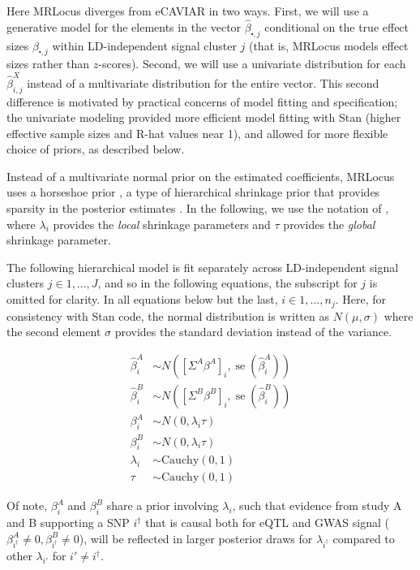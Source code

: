 \documentclass[11pt]{article}
\DeclareMathOperator{\se}{\textrm{se}}
\begin{document}
Here MRLocus diverges from eCAVIAR in two ways. First, we will use a
generative model for the elements in the vector
$\widehat{\beta}_{\centerdot,j}$ conditional on the true effect sizes
$\beta_{\centerdot,j}$ within LD-independent signal cluster
$j$ (that is, MRLocus models effect sizes rather than $z$-scores).
Second, we will use a univariate distribution for each
$\widehat{\beta}^X_{i,j}$ instead of a multivariate distribution for
the entire vector. This second difference is motivated by practical
concerns of model fitting and specification; the univariate modeling
provided more efficient model fitting with Stan (higher effective
sample sizes and R-hat values near 1), and allowed for more
flexible choice of priors, as described below. 

Instead of a multivariate normal prior on the estimated coefficients,
MRLocus uses a horseshoe prior \citep{horseshoe1,horseshoe2}, 
a type of hierarchical shrinkage prior that provides sparsity in the
posterior estimates \citep{hiershrink}. In the following, we use the
notation of \citet{horseshoe1}, where $\lambda_i$ provides the
\emph{local} shrinkage parameters and $\tau$ provides the
\emph{global} shrinkage parameter.

The following hierarchical model is fit separately across
LD-independent signal clusters $j \in 1,\dots,J$, and so in the
following equations, the subscript for $j$ is omitted for clarity. In
all equations below but the last, $i \in 1,\dots,n_j$. Here, for
consistency with Stan code, the normal distribution is written as
$N(\mu,\sigma)$ where the second element $\sigma$ provides the
standard deviation instead of the variance.

\begin{align}
  \widehat{\beta}^A_i &\sim N([\Sigma^A \beta^A]_i, \se(\widehat{\beta}^A_i)) \\
  \widehat{\beta}^B_i &\sim N([\Sigma^B \beta^B]_i, \se(\widehat{\beta}^B_i)) \\
  \beta_i^A &\sim N(0, \lambda_i \tau) \\
  \beta_i^B &\sim N(0, \lambda_i \tau) \\
  \lambda_i &\sim \textrm{Cauchy}(0,1) \\
  \tau &\sim \textrm{Cauchy}(0,1)
\end{align}

Of note, $\beta_i^A$ and $\beta_i^B$ share a prior involving
$\lambda_i$, such that evidence from study A and B supporting a
SNP $i^\dagger$ that is causal both for eQTL and GWAS signal
($\beta_{i^\dagger}^A \ne 0, \beta_{i^\dagger}^B \ne 0$),
will be reflected in larger posterior draws for $\lambda_{i^\dagger}$
compared to other $\lambda_{i'}$ for $i' \ne i^\dagger$.
\end{document}
